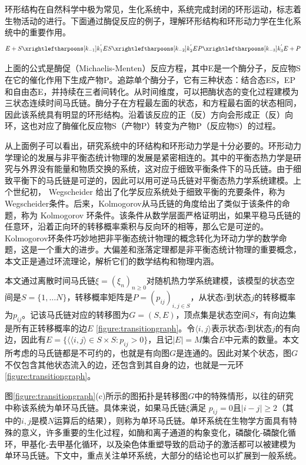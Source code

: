 

环形结构在自然科学中极为常见，生化系统中，系统完成封闭的环形运动，标志着生物活动的进行。下面通过酶促反应的例子，理解环形结构和环形动力学在生化系统中的重要作用。
\begin{equation*}
    E + S \xrightleftharpoons[k_{-1}]{k^{'}_1}
    ES \xrightleftharpoons[k_{-2}]{k^{'}_2}
    EP \xrightleftharpoons[k_{-3}]{k^{'}_3}
    E + P
\end{equation*}

上面的公式是酶促（Michaelis-Menten）反应方程，其中E是一个酶分子，反应物S在它的催化作用下生成产物P。追踪单个酶分子，它有三种状态：结合态ES，EP和自由态E，并持续在三者间转化。从时间维度，可以把酶状态的变化过程建模为三状态连续时间马氏链。酶分子在方程最左面的状态，和方程最右面的状态相同，因此该系统具有明显的环形结构。沿着该反应的正（反）方向会形成正（反）向环，这也对应了酶催化反应物S（产物P）转变为产物P（反应物S）的过程。

从上面例子可以看出，研究系统中的环结构和环形动力学是十分必要的。环形动力学理论的发展与非平衡态统计物理的发展是紧密相连的。其中的平衡态热力学是研究与外界没有能量和物质交换的系统，这对应于细致平衡条件下的马氏链。由于细致平衡下的马氏链是可逆的，因此可以用可逆马氏链对平衡态热力学系统建模。上个世纪初， Wegscheider 给出了化学反应系统处于细致平衡的充要条件，称为Wegscheider条件。后来，Kolmogorov从马氏链的角度给出了类似于该条件的命题，称为 Kolmogorov 环条件。该条件从数学层面严格证明出，如果平稳马氏链的任意环，沿着正向环的转移概率乘积与反向环的相等，那么它是可逆的。Kolmogorov环条件巧妙地把非平衡态统计物理的概念转化为环动力学的数学命题，这是一个重大的进步。大偏差和涨落定理都是非平衡态统计物理的重要概念，本文正是通过环流理论，解析它们的数学结构和物理内涵。

本文通过离散时间马氏链$\xi = (\xi_n)_{n \ge 0}$对随机热力学系统建模，该模型的状态空间是$S = \{1, \dots N\}$，转移概率矩阵是$P=(p_{ij})_{i,j \in S}$，从状态$i$到状态$j$的转移概率为$p_{ij}$。记该马氏链对应的转移图为$G=(S, E)$，顶点集是状态空间$S$，有向边集是所有正转移概率的边$E$ \ref{figure:transitiongraph}。令$\langle i, j\rangle$表示状态$i$到状态$j$的有向边，因此有$E = \{\langle \langle i, j\rangle \in S \times S: p_{ij}>0\}$，且记$|E| = M$集合$E$中元素的数量。本文所考虑的马氏链都是不可约的，也就是有向图$G$是连通的。因此对某个状态，图$G$不仅包含其他状态流入的边，还包含到其自身的边，也就是一元环 \ref{figure:transitiongraph}。

图\ref{figure:transitiongraph}(c)所示的图拓扑是转移图$G$中的特殊情形，以往的研究中称该系统为单环马氏链。具体来说，如果马氏链$\xi$满足 $p_{ij}=0$且$|i-j| \ge 2$（其中的$i,j$是模$N$运算后的结果），则称为单环马氏链。单环系统在生物学方面具有特殊的意义，许多重要的生化过程，如酶和离子通道的构象变化\cite{cornish2013fundamentals,sakmann2013single}，磷酸化-磷酸化循环\cite{beard2008chemical}，甲基化-去甲基化循环\cite{jia2017nonequilibrium}，以及染色体重塑导致的启动子的激活\cite{pedraza2008effects,jia2022analytical}都可以被建模为单环马氏链。下文中，重点关注单环系统，大部分的结论也可以扩展到一般系统。

